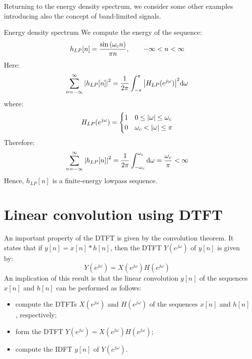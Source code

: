 \documentclass[../../main/main.tex]{subfiles}
\begin{document}
Returning to the energy density spectrum, we consider some other examples introducing also the concept of band-limited signals.

\begin{example}{Energy density spectrum}{}
    We compute the energy of the sequence:
    \begin{equation}
        h_{LP}[n]
        =
        \frac{\sin\qty(\omega_{c}n)}{\pi n},
        \qquad -\infty < n < \infty
        \label{eq:L09_S15_1}
    \end{equation}
    Here:
    \begin{equation}
        \sum_{n=-\infty}^{\infty} \abs{h_{LP}[n]}^2
        =
        \frac{1}{2\pi} \int_{-\pi}^{\pi} \abs{H_{LP}(e^{j\omega})}^2 \mathrm{d}{\omega}
        \label{eq:L09_S15_2}
    \end{equation}
    where:
    \begin{equation}
        H_{LP}(e^{j\omega})
        =
        \begin{cases}
            1   &   0 \le \abs{\omega} \le \omega_{c}   \\
            0   &   \omega_{c} < \abs{\omega} \le \pi
        \end{cases}
        \label{eq:L09_S15_3}
    \end{equation}
    Therefore:
    \begin{equation}
        \sum_{n=-\infty}^{\infty} \abs{h_{LP}[n]}^2
        =
        \frac{1}{2\pi} \int_{-\omega_{c}}^{\omega_{c}} \mathrm{d}{\omega}
        =
        \frac{\omega_{c}}{\pi}
        <
        \infty
        \label{eq:L09_S16_1}
    \end{equation}
    Hence, \( h_{LP}[n] \) is a finite-energy lowpass sequence.
\end{example}





\section{Linear convolution using DTFT}
An important property of the DTFT is given by the convolution theorem. It states that if \( y[n] = x[n] * h[n] \), then the DTFT \( Y(e^{j\omega}) \) of \( y[n] \) is given by:
\begin{equation}
    Y(e^{j\omega})
    =
    X(e^{j\omega}) H(e^{j\omega})
    \label{eq:L09_S17_1}
\end{equation}
An implication of this result is that the linear convolution \( y[n] \) of the sequences \( x[n] \) and \( h[n] \) can be performed as follows:
\begin{itemize}
    \item compute the DTFTs \( X(e^{j\omega}) \) and \( H(e^{j\omega}) \) of the sequences \( x[n] \) and \( h[n] \), respectively;
    \item form the DTFT \( Y(e^{j\omega}) = X(e^{j\omega}) H(e^{j\omega}) \);
    \item compute the IDFT \( y[n] \) of \( Y(e^{j\omega}) \).
\end{itemize}
\end{document}
